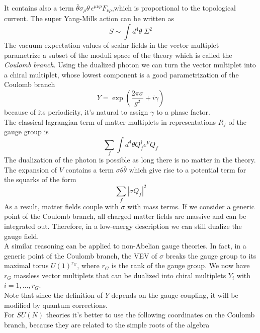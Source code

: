 It contains also a term $ \bar{\theta} \sigma_{\rho} \theta \, \epsilon^{\mu \nu \rho} F_{\nu \rho}$,which is proportional to the topological current.
The super Yang-Mills action can be written as
\begin{equation}
S \sim \int d^4 \theta \; \Sigma^2
\end{equation}
The  vacuum expectation values of scalar fields in the vector multiplet parametrize a subset of the moduli space of the theory which is called the \emph{Coulomb branch}.
Using the dualized photon we can turn the vector multiplet into a chiral multiplet, whose lowest component is a good parametrization of the Coulomb branch 
\begin{equation}
 Y = \exp{ \left( \frac{2 \pi \sigma}{g^2} + i \gamma \right)}
\end{equation}
because of its periodicity, it's natural to assign $\gamma$ to a phase factor.\\
The classical lagrangian term of matter multiplets in representations $R_f$ of the gauge group is
\begin{equation}
\sum_f \int d^4 \theta Q^{\dagger}_f  e^{V} Q_{f}
\end{equation}
The dualization of the photon is possible as long there is no matter in the theory.\\
The expansion of $V$ contains a term $\sigma \theta \bar{\theta}$ which give rise to a potential term for the squarks of the form
\begin{equation}
\sum_f | \sigma Q_f|^2
\end{equation}
As a result, matter fields couple with $\sigma$ with mass terms. 
If we consider a generic point of the Coulomb branch, all charged matter fields are massive and can be integrated out.
Therefore, in a low-energy description we can still dualize the gauge field.\\
A similar reasoning can be applied to non-Abelian gauge theories.
In fact, in a generic point of the Coulomb branch, the VEV of $\sigma$ breaks the gauge group to its maximal torus $U(1)^{r_G}$, where $r_G$ is the rank of the gauge group. 
We now have $r_G$ massless vector multiplets that can be dualized into chiral multiplets $Y_i$ with $i=1,\dotsc,r_G$.
\\
Note that since the definition of $Y$ depends on the gauge coupling, it will be modified by quantum corrections.
\\
For $ SU(N)$ theories it's better to use the following coordinates on the Coulomb branch, because they are related to the simple roots of the algebra
